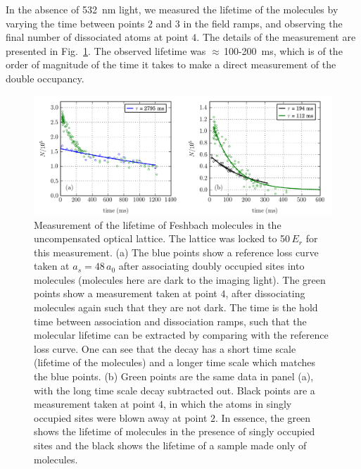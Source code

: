 In the absence of 532~nm light, we measured the lifetime of the molecules by
varying the time between points $\boxed{2}$ and $\boxed{3}$ in the field ramps,
and observing the final number of dissociated atoms at point $\boxed{4}$.  The
details of the measurement are presented in Fig.~\ref{fig:molecule-lifetime}.
The observed lifetime was $\approx\,$100-200~ms, which is of the order of
magnitude of  the time it takes to make a direct measurement of the double
occupancy.    
\begin{figure}
\centering
\includegraphics[width=\textwidth]{../figures/double_occ/lifetime_thesis.png}
\caption[Molecule lifetime]{Measurement of the lifetime of Feshbach molecules
in the uncompensated optical lattice.  The lattice was locked to 50\,$E_{r}$
for this measurement.  \vspace{0.5em}\newline  (a)  The blue points show a
reference loss curve taken at $a_{s}=48\,a_{0}$ after associating doubly
occupied sites into molecules (molecules here are dark to the imaging light).
The green points show a measurement taken at point $\boxed{4}$, after
dissociating molecules again such that they are not dark. The time is the hold
time between association and dissociation ramps, such that the molecular
lifetime can be extracted by comparing with the reference loss curve.  One can
see that the decay has a short time scale (lifetime of the molecules) and a
longer time scale which matches the blue points. \vspace{0.5em} \newline (b)
Green points are the same data in panel (a), with the long time scale decay
subtracted out.  Black points are a measurement taken at point $\boxed{4}$, in
which the atoms in singly occupied sites were blown away at point $\boxed{2}$.
In essence, the green shows the lifetime of molecules in the presence of singly
occupied sites and the black shows the lifetime of a sample made only of
molecules.  } 
\label{fig:molecule-lifetime}
\end{figure}

